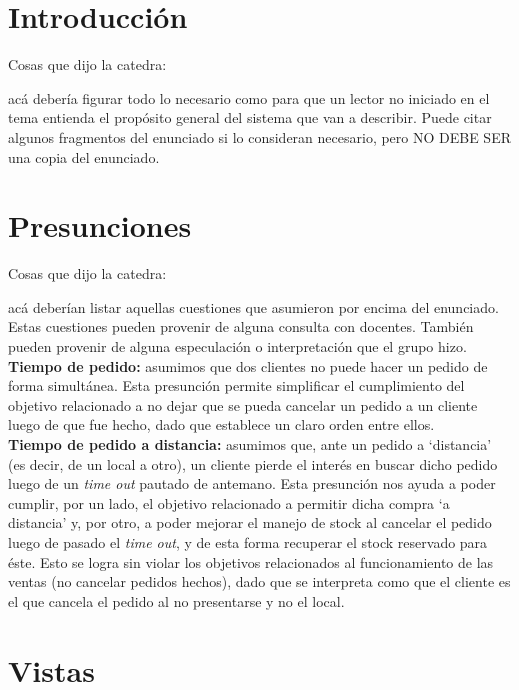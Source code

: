 \documentclass[a4paper,10pt]{article}
\begin{document}
\tableofcontents

\newpage


\section*{Introducci\'on}

Cosas que dijo la catedra:

acá debería figurar todo lo necesario como para que un
lector no iniciado en el tema entienda el propósito general del
sistema que van a describir. Puede citar algunos fragmentos del
enunciado si lo consideran necesario, pero NO DEBE SER una copia del
enunciado.

\section*{Presunciones}

Cosas que dijo la catedra:

acá deberían listar aquellas cuestiones que asumieron
por encima del enunciado. Estas cuestiones pueden provenir de alguna
consulta con docentes. También pueden provenir de alguna especulación
o interpretación que el grupo hizo.
\noindent
\textbf{Tiempo de pedido:} asumimos que dos clientes no puede hacer un pedido de forma simultánea. Esta presunción permite simplificar el cumplimiento del objetivo relacionado a no dejar que se pueda cancelar un pedido a un cliente luego de que fue hecho, dado que establece un claro orden entre ellos. \\
\textbf{Tiempo de pedido a distancia:} asumimos que, ante un pedido a `distancia' (es decir, de un local a otro), un cliente pierde el interés en buscar dicho pedido luego de un \textit{time out} pautado de antemano. Esta presunción nos ayuda a poder cumplir, por un lado, el objetivo relacionado a permitir dicha compra `a distancia' y, por otro, a poder mejorar el manejo de stock al cancelar el pedido luego de pasado el \textit{time out}, y de esta forma recuperar el stock reservado para éste. Esto se logra sin violar los objetivos relacionados al funcionamiento de las ventas (no cancelar pedidos hechos), dado que se interpreta como que el cliente es el que cancela el pedido al no presentarse y no el local.


\section*{Vistas}
\end{document}
